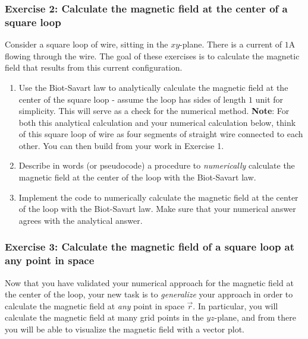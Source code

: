 \documentclass[]{article}
\providecommand{\tightlist}{%
  \setlength{\itemsep}{0pt}\setlength{\parskip}{0pt}}
\begin{document}
\subsubsection{Exercise 2: Calculate the magnetic field at the center of
a square
loop}\label{exercise-2-calculate-the-magnetic-field-at-the-center-of-a-square-loop}

Consider a square loop of wire, sitting in the \(xy\)-plane. There is a
current of \(1\)A flowing through the wire. The goal of these exercises
is to calculate the magnetic field that results from this current
configuration.

\begin{enumerate}
\def\labelenumi{\arabic{enumi}.}
\tightlist
\item
  Use the Biot-Savart law to analytically calculate the magnetic field
  at the center of the square loop - assume the loop has sides of length
  \(1\) unit for simplicity. This will serve as a check for the
  numerical method. \textbf{Note}: For both this analytical calculation
  and your numerical calculation below, think of this square loop of
  wire as four segments of straight wire connected to each other. You
  can then build from your work in Exercise 1.\\
\item
  Describe in words (or pseudocode) a procedure to \emph{numerically}
  calculate the magnetic field at the center of the loop with the
  Biot-Savart law.\\
\item
  Implement the code to numerically calculate the magnetic field at the
  center of the loop with the Biot-Savart law. Make sure that your
  numerical answer agrees with the analytical answer.
\end{enumerate}

\subsubsection{Exercise 3: Calculate the magnetic field of a square loop
at any point in
space}\label{exercise-3-calculate-the-magnetic-field-of-a-square-loop-at-any-point-in-space}

Now that you have validated your numerical approach for the magnetic
field at the center of the loop, your new task is to \emph{generalize}
your approach in order to calculate the magnetic field at \emph{any}
point in space \(\vec{r}\). In particular, you will calculate the
magnetic field at many grid points in the \(yz\)-plane, and from there
you will be able to visualize the magnetic field with a vector plot.
\end{document}
